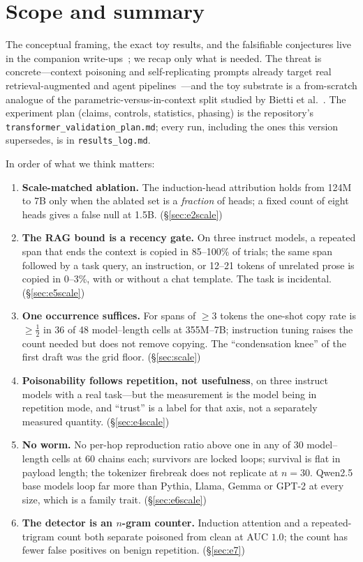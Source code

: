 \documentclass[11pt]{article}
\theoremstyle{plain}
\theoremstyle{definition}
\theoremstyle{remark}
\begin{document}
\section{Scope and summary}\label{sec:status}
The conceptual framing, the exact toy results, and the falsifiable conjectures live in the
companion write-ups~\cite{shumow2026trust,shumow2026contagion}; we recap only what is needed.
The threat is concrete---context poisoning and self-replicating prompts already target real
retrieval-augmented and agent pipelines~\cite{greshake2023,cohen2024}---and the toy substrate
is a from-scratch analogue of the parametric-versus-in-context split studied by Bietti et
al.~\cite{bietti2023}. The experiment plan (claims, controls, statistics, phasing) is the
repository's \texttt{transformer\_validation\_plan.md}; every run, including the ones this
version supersedes, is in \texttt{results\_log.md}.

In order of what we think matters:
\begin{enumerate}\itemsep2pt
\item \textbf{Scale-matched ablation.} The induction-head attribution holds from 124M to 7B
  only when the ablated set is a \emph{fraction} of heads; a fixed count of eight heads gives a
  false null at 1.5B. (\S\ref{sec:e2scale})
\item \textbf{The RAG bound is a recency gate.} On three instruct models, a repeated span that
  ends the context is copied in 85--100\% of trials; the same span followed by a task query,
  an instruction, or 12--21 tokens of unrelated prose is copied in 0--3\%, with or without a
  chat template. The task is incidental. (\S\ref{sec:e5scale})
\item \textbf{One occurrence suffices.} For spans of $\ge3$ tokens the one-shot copy rate is
  $\ge\tfrac12$ in 36 of 48 model--length cells at 355M--7B; instruction tuning raises the
  count needed but does not remove copying. The ``condensation knee'' of the first draft was
  the grid floor. (\S\ref{sec:scale})
\item \textbf{Poisonability follows repetition, not usefulness}, on three instruct models
  with a real task---but the measurement is the model being in repetition mode, and ``trust''
  is a label for that axis, not a separately measured quantity. (\S\ref{sec:e4scale})
\item \textbf{No worm.} No per-hop reproduction ratio above one in any of 30 model--length
  cells at 60 chains each; survivors are locked loops; survival is flat in payload length; the
  tokenizer firebreak does not replicate at $n{=}30$. Qwen2.5 base models loop far more than
  Pythia, Llama, Gemma or GPT-2 at every size, which is a family trait. (\S\ref{sec:e6scale})
\item \textbf{The detector is an $n$-gram counter.} Induction attention and a repeated-trigram
  count both separate poisoned from clean at AUC $1.0$; the count has fewer false positives on
  benign repetition. (\S\ref{sec:e7})
\end{enumerate}
\end{document}
